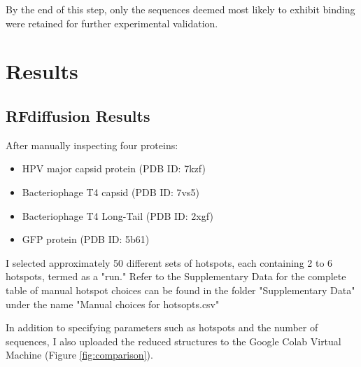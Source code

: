\documentclass[11pt,a4paper]{article}
\begin{document}
By the end of this step, only the sequences deemed most likely to exhibit binding were retained for further experimental validation.


\section{Results}

\subsection{RFdiffusion Results}

After manually inspecting four proteins:

\begin{itemize}
    \item HPV major capsid protein (PDB ID: 7kzf)
    \item Bacteriophage T4 capsid (PDB ID: 7vs5)
    \item Bacteriophage T4 Long-Tail (PDB ID: 2xgf)
    \item GFP protein (PDB ID: 5b61)
\end{itemize}

I selected approximately 50 different sets of hotspots, each containing 2 to 6 hotspots, termed as a "run." Refer to the Supplementary Data for the complete table of manual hotspot choices can be found in the folder "Supplementary Data" under the name "Manual choices for hotsopts.csv"

In addition to specifying parameters such as hotspots and the number of sequences, I also uploaded the reduced structures to the Google Colab Virtual Machine (Figure \ref{fig:comparison}).
\end{document}
